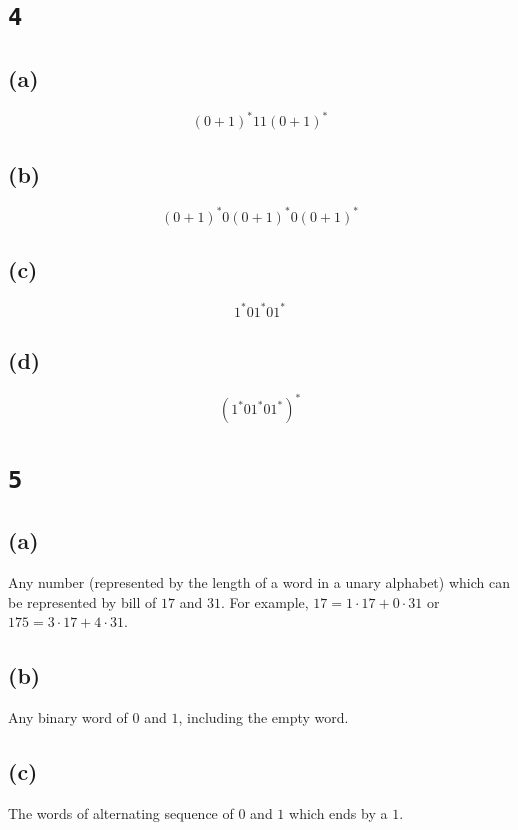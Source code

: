 \documentclass[a4paper,11pt]{report}
\begin{document}
\section*{\texttt{4}}

\subsection*{(a)}

\[
  (0 + 1)^*
  11
  (0 + 1)^*
\]

\subsection*{(b)}

\[
  (0+1)^* 0 (0+1)^* 0 (0+1)^*
\]

\subsection*{(c)}

\[
  1^* 0 1^* 0 1^*
\]

\subsection*{(d)}

\[
  (1^* 0 1^* 0 1^*)^*
\]

\section*{\texttt{5}}

\subsection*{(a)}

Any number (represented by the length of a word in a unary alphabet) which can
be represented by bill of $17$ and $31$. For example, $17 = 1 \cdot 17 + 0 \cdot
31$ or $ 175 = 3 \cdot 17 + 4 \cdot 31$.

\subsection*{(b)}

Any binary word of $0$ and $1$, including the empty word.

\subsection*{(c)}

The words of alternating sequence of $0$ and $1$ which ends by a $1$.
\end{document}
